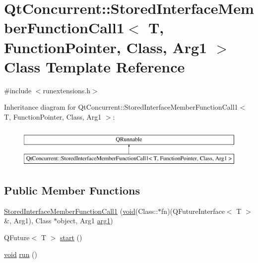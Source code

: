 \hypertarget{class_qt_concurrent_1_1_stored_interface_member_function_call1}{\section{Qt\-Concurrent\-:\-:Stored\-Interface\-Member\-Function\-Call1$<$ T, Function\-Pointer, Class, Arg1 $>$ Class Template Reference}
\label{class_qt_concurrent_1_1_stored_interface_member_function_call1}
}


{\ttfamily \#include $<$runextensions.\-h$>$}

Inheritance diagram for Qt\-Concurrent\-:\-:Stored\-Interface\-Member\-Function\-Call1$<$ T, Function\-Pointer, Class, Arg1 $>$\-:\begin{figure}[H]
\begin{center}
\leavevmode
\includegraphics[height=2.000000cm]{class_qt_concurrent_1_1_stored_interface_member_function_call1}
\end{center}
\end{figure}
\subsection*{Public Member Functions}
\begin{DoxyCompactItemize}
\item 
\hyperlink{class_qt_concurrent_1_1_stored_interface_member_function_call1_a4438945467c7b0c8f914210c2427f706}{Stored\-Interface\-Member\-Function\-Call1} (\hyperlink{group___u_a_v_objects_plugin_ga444cf2ff3f0ecbe028adce838d373f5c}{void}(Class\-::$\ast$fn)(Q\-Future\-Interface$<$ T $>$ \&, Arg1), Class $\ast$object, Arg1 \hyperlink{glext_8h_a4b247ab422408c1761a36f9034c2585b}{arg1})
\item 
Q\-Future$<$ T $>$ \hyperlink{class_qt_concurrent_1_1_stored_interface_member_function_call1_aa08de118bb8d8745a897be4aeaa11778}{start} ()
\item 
\hyperlink{group___u_a_v_objects_plugin_ga444cf2ff3f0ecbe028adce838d373f5c}{void} \hyperlink{class_qt_concurrent_1_1_stored_interface_member_function_call1_aef8620acb1f20dfe89e4378cdc654871}{run} ()
\end{DoxyCompactItemize}


